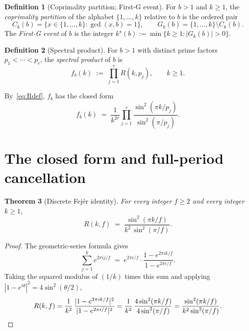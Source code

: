\documentclass[11pt,reqno]{amsart}
\theoremstyle{plain}
\newtheorem{theorem}{Theorem}[section]
\theoremstyle{definition}
\newtheorem{definition}[theorem]{Definition}
\theoremstyle{remark}
\begin{document}
\begin{definition}[Coprimality partition; First-G event]\label{def:partition}
For $b > 1$ and $k \ge 1$, the \emph{coprimality partition} of the
alphabet $\{1, \dots, k\}$ relative to $b$ is the ordered pair
\[
  C_{k}(b) = \{x \in \{1, \dots, k\} : \gcd(x, b) = 1\},
  \qquad
  G_{k}(b) = \{1, \dots, k\} \setminus C_{k}(b).
\]
The \emph{First-G event} of $b$ is the integer
$k^{\star}(b) := \min\{k \ge 1 : |G_{k}(b)| > 0\}$.
\end{definition}

\begin{definition}[Spectral product]\label{def:spectral-product}
For $b > 1$ with distinct prime factors $p_{1} < \cdots < p_{r}$, the
\emph{spectral product} of $b$ is
\begin{equation}\label{eq:spectral-product}
  f_{b}(k) \;:=\; \prod_{j=1}^{r} R(k, p_{j}), \qquad k \ge 1.
\end{equation}
\end{definition}

By~\eqref{eq:Rdef}, $f_{b}$ has the closed form
\[
  f_{b}(k) \;=\; \frac{1}{k^{2r}}
                 \prod_{j=1}^{r}
                 \frac{\sin^{2}(\pi k/p_{j})}{\sin^{2}(\pi/p_{j})}.
\]

\section{The closed form and full-period cancellation}\label{sec:fullperiod}

\begin{theorem}[Discrete Fej\'{e}r identity]\label{thm:closedform}
For every integer $f \ge 2$ and every integer $k \ge 1$,
\begin{equation}\label{eq:closedform}
  R(k, f) \;=\; \frac{\sin^{2}(\pi k/f)}{k^{2}\,\sin^{2}(\pi/f)}.
\end{equation}
\end{theorem}

\begin{proof}
The geometric-series formula gives
\[
  \sum_{j=1}^{k} e^{2\pi i j/f}
  \;=\;
  e^{2\pi i/f} \cdot \frac{1 - e^{2\pi i k/f}}{1 - e^{2\pi i/f}}.
\]
Taking the squared modulus of $(1/k)$ times this sum and applying
$|1 - e^{i\theta}|^{2} = 4 \sin^{2}(\theta/2)$,
\[
  R(k, f)
  = \frac{1}{k^{2}}\,
    \frac{|1 - e^{2\pi i k/f}|^{2}}{|1 - e^{2\pi i/f}|^{2}}
  = \frac{1}{k^{2}}\,
    \frac{4 \sin^{2}(\pi k/f)}{4 \sin^{2}(\pi/f)}
  = \frac{\sin^{2}(\pi k/f)}{k^{2} \sin^{2}(\pi/f)}.
\qedhere
\]
\end{proof}
\end{document}
